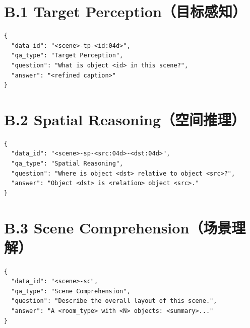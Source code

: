 \documentclass[type=bachelor,oneside]{fduthesis}
\begin{document}
\section*{B.1 Target Perception（目标感知）}

\begin{verbatim}
{
  "data_id": "<scene>-tp-<id:04d>",
  "qa_type": "Target Perception",
  "question": "What is object <id> in this scene?",
  "answer": "<refined caption>"
}
\end{verbatim}

\section*{B.2 Spatial Reasoning（空间推理）}

\begin{verbatim}
{
  "data_id": "<scene>-sp-<src:04d>-<dst:04d>",
  "qa_type": "Spatial Reasoning",
  "question": "Where is object <dst> relative to object <src>?",
  "answer": "Object <dst> is <relation> object <src>."
}
\end{verbatim}

\section*{B.3 Scene Comprehension（场景理解）}

\begin{verbatim}
{
  "data_id": "<scene>-sc",
  "qa_type": "Scene Comprehension",
  "question": "Describe the overall layout of this scene.",
  "answer": "A <room_type> with <N> objects: <summary>..."
}
\end{verbatim}
\end{document}

